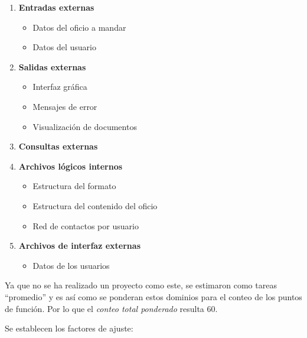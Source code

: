 \documentclass[letterpaper]{article}
\begin{document}
\begin{enumerate}
\item \textbf{Entradas externas}
  \begin{itemize}
  \item Datos del oficio a mandar
  \item Datos del usuario
  \end{itemize}
\item \textbf{Salidas externas}
  \begin{itemize}
  \item Interfaz gráfica
  \item Mensajes de error
  \item Visualización de documentos
  \end{itemize}
\item \textbf{Consultas externas}
\item \textbf{Archivos lógicos internos}
  \begin{itemize}
    \item Estructura del formato
    \item Estructura del contenido del oficio
    \item Red de contactos por usuario
  \end{itemize}
\item \textbf{Archivos de interfaz externas}
  \begin{itemize}
  \item Datos de los usuarios
  \end{itemize}
\end{enumerate}

Ya que no se ha realizado un proyecto como este, se estimaron como tareas ``promedio'' y es así como se ponderan estos dominios para el conteo de los puntos de función. Por lo que el \emph{conteo total ponderado} resulta 60.

Se establecen los factores de ajuste:
\end{document}
